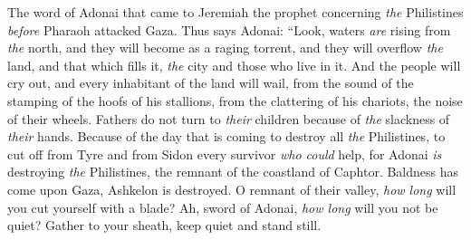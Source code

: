 \begin{biblechapter} %
 The word of Adonai that came to Jeremiah the prophet concerning \textit{the} Philistines \textit{before} Pharaoh attacked Gaza.
\verse Thus says Adonai:
\verse “Look, waters \textit{are} rising from \textit{the} north, 
and they will become as a raging torrent, 
and they will overflow \textit{the} land, 
and that which fills it, 
\textit{the} city and those who live in it. 
And the people will cry out, 
and every inhabitant of the land will wail,
\verse from the sound of the stamping of the hoofs of his stallions, 
from the clattering of his chariots, 
the noise of their wheels. 
Fathers do not turn to \textit{their} children 
because of \textit{the} slackness of \textit{their} hands.
\verse Because of the day that is coming 
to destroy all \textit{the} Philistines, 
to cut off from Tyre and from Sidon 
every survivor \textit{who could} help, 
for Adonai \textit{is} destroying \textit{the} Philistines, 
the remnant of the coastland of Caphtor.
\verse Baldness has come upon Gaza, 
Ashkelon is destroyed. 
O remnant of their valley, 
\textit{how long} will you cut yourself with a blade?
\verse Ah, sword of Adonai, 
\textit{how long} will you not be quiet? 
Gather to your sheath, 
keep quiet and stand still.
\end{biblechapter}

